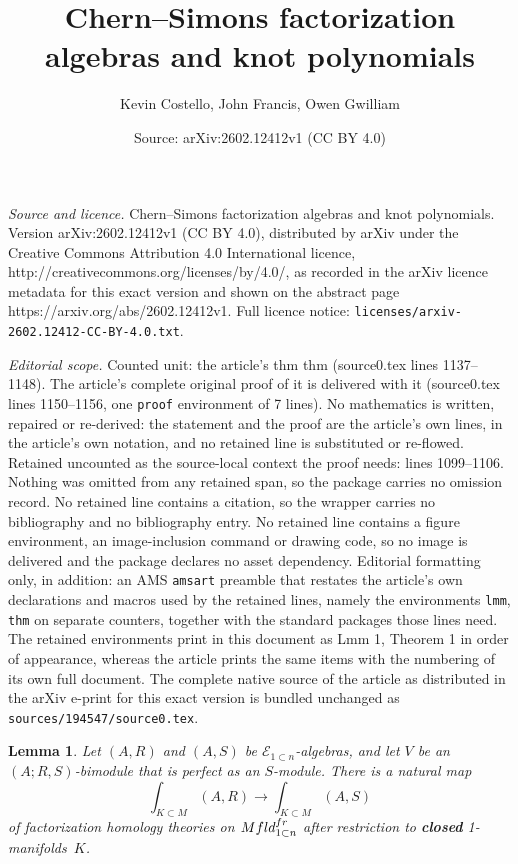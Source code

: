 \documentclass[10pt,a4paper]{amsart}
\title{Chern--Simons factorization algebras and knot polynomials}
\author{Kevin Costello, John Francis, Owen Gwilliam}
\date{Source: arXiv:2602.12412v1 (CC BY 4.0)}
\newtheorem{lmm}{Lemma}
\def\Mfld{{\rm Mfld}}
\def\cE{\mathcal E}\def\cF{\mathcal F}\def\cG{\mathcal G}\def\cH{\mathcal H}
\def\fr{{\rm fr}}
\begin{document}
\maketitle

\noindent\emph{Source and licence.} Chern--Simons factorization algebras and knot polynomials. Version arXiv:2602.12412v1 (CC BY 4.0), distributed by arXiv under the Creative Commons Attribution 4.0 International licence, http://creativecommons.org/licenses/by/4.0/, as recorded in the arXiv licence metadata for this exact version and shown on the abstract page https://arxiv.org/abs/2602.12412v1. Full licence notice: \texttt{licenses/arxiv-2602.12412-CC-BY-4.0.txt}.\par\smallskip

\noindent\textit{Editorial scope.} Counted unit: the article's thm thm (source0.tex lines 1137--1148). The article's complete original proof of it is delivered with it (source0.tex lines 1150--1156, one \texttt{proof} environment of 7 lines). No mathematics is written, repaired or re-derived: the statement and the proof are the article's own lines, in the article's own notation, and no retained line is substituted or re-flowed.  Retained uncounted as the source-local context the proof needs: lines 1099--1106.  Nothing was omitted from any retained span, so the package carries no omission record.  No retained line contains a citation, so the wrapper carries no bibliography and no bibliography entry.  No retained line contains a figure environment, an image-inclusion command or drawing code, so no image is delivered and the package declares no asset dependency.  Editorial formatting only, in addition: an AMS \texttt{amsart} preamble that restates the article's own declarations and macros used by the retained lines, namely the environments \texttt{lmm}, \texttt{thm} on separate counters, together with the standard packages those lines need.  The retained environments print in this document as Lmm 1, Theorem 1 in order of appearance, whereas the article prints the same items with the numbering of its own full document.  The complete native source of the article as distributed in the arXiv e-print for this exact version is bundled unchanged as \texttt{sources/194547/source0.tex}.
\begin{lmm}\label{lemma.bimmodule}
Let $(A,R)$ and $(A,S)$ be $\cE_{1\subset n}$-algebras, 
and let $V$ be an $(A;R,S)$-bimodule that is perfect as an $S$-module. There is a natural map
\[
\int_{K\subset M}(A,R) \to \int_{K\subset M}(A,S)
\]
of factorization homology theories on $\Mfld_{1\subset n}^{\fr}$ after restriction to {\bf closed} 1-manifolds~$K$.
\end{lmm}
\end{document}
